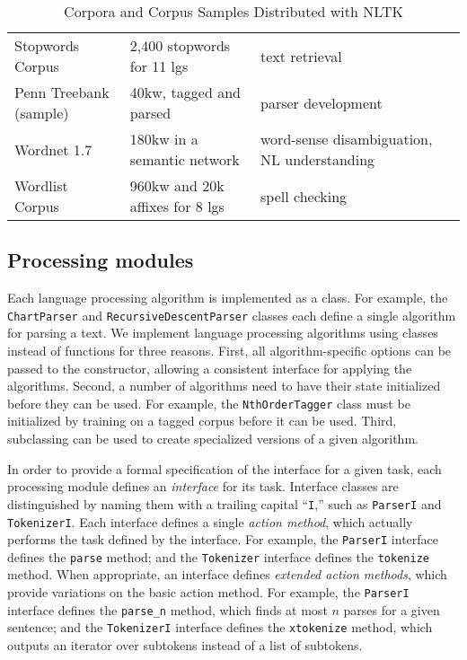 \documentclass[11pt]{article}
\begin{document}
\begin{table*}
\begin{boxedminipage}{\linewidth}
\begin{tabular}{llll}
Stopwords Corpus &
2,400 stopwords for 11 lgs &
text retrieval \\

Penn Treebank (sample) &
40kw, tagged and parsed &
parser development \\

Wordnet 1.7 &
180kw in a semantic network &
word-sense disambiguation, NL understanding \\

Wordlist Corpus &
960kw and 20k affixes for 8 lgs &
spell checking
 \\
\end{tabular}
\caption{Corpora and Corpus Samples Distributed with NLTK}\label{tab:data}
\end{boxedminipage}
\end{table*}

\subsection{Processing modules}

Each language processing algorithm is implemented as a class.  For
example, the \texttt{ChartParser} and
\texttt{Recursive\-Descent\-Parser} classes each define a single
algorithm for parsing a text.  We implement language processing
algorithms using classes instead of functions for three reasons.
First, all algorithm-specific options can be passed to the
constructor, allowing a consistent interface for applying the
algorithms.  Second, a number of algorithms need to have their state
initialized before they can be used.  For example, the
\texttt{NthOrderTagger} class must be initialized by training on a
tagged corpus before it can be used.  Third, subclassing can be used
to create specialized versions of a given algorithm.

In order to provide a formal specification of the interface for a
given task, each processing module defines an \emph{interface} for its task.
Interface classes are distinguished by naming them with a trailing
capital ``\texttt{I},'' such as \texttt{ParserI} and
\texttt{TokenizerI}.
Each interface defines a single \emph{action method}, which actually
performs the task defined by the interface.  For example, the
\texttt{ParserI} interface defines the \texttt{parse} method; and the
\texttt{Tokenizer} interface defines the \texttt{tokenize} method.
When appropriate, an interface defines \emph{extended action
  methods}, which provide variations on the basic action method.  For
example, the \texttt{ParserI} interface defines the \texttt{parse\_n}
method, which finds at most $n$ parses for a given sentence; and
the \texttt{TokenizerI} interface defines the \texttt{xtokenize}
method, which outputs an iterator over subtokens instead of a list of
subtokens.
\end{document}
